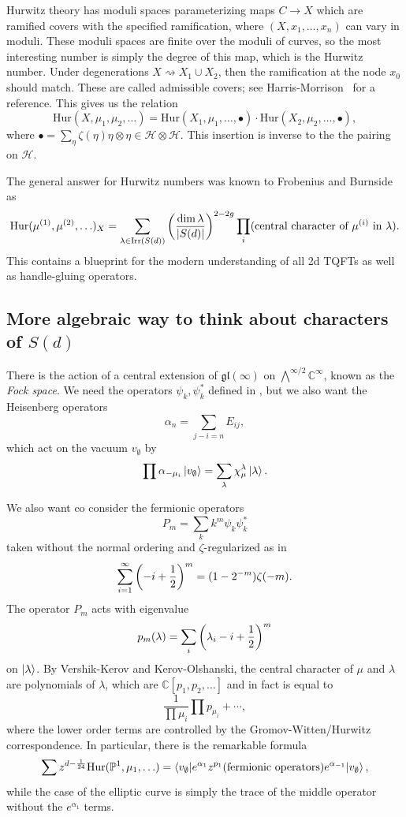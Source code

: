\documentclass[leqno, openany]{memoir}
\theoremstyle{definition}
\theoremstyle{remark}
\theoremstyle{plain}
\theoremstyle{definition}
\theoremstyle{remark}
\newcommand{\C}{\mathbb{C}}
\renewcommand{\P}{\mathbb{P}}
\newcommand{\mc}[1]{\mathcal{#1}}
\newcommand{\mf}[1]{\mathfrak{#1}}
\newcommand{\mr}[1]{\mathrm{#1}}
\begin{document}
Hurwitz theory has moduli spaces parameterizing maps $C \to X$ which are ramified covers with the specified ramification, where $(X, x_1, \ldots, x_n)$ can vary in moduli. These moduli spaces are finite over the moduli of curves, so the most interesting number is simply the degree of this map, which is the Hurwitz number. Under degenerations $X \rightsquigarrow X_1 \cup X_2$, then the ramification at the node $x_0$ should match. These are called admissible covers; see Harris-Morrison~\cite{harmor} for a reference. This gives us the relation
\[ \mr{Hur}(X, \mu_1, \mu_2, \ldots) = \mr{Hur}(X_1, \mu_1, \ldots, \bullet) \cdot \mr{Hur}(X_2, \mu_2, \ldots, \bullet), \]
where $\bullet = \sum_{\eta} \zeta(\eta) \eta \otimes \eta \in \mc{H} \otimes \mc{H}$. This insertion is inverse to the the pairing on $\mc{H}$.

The general answer for Hurwitz numbers was known to Frobenius and Burnside as
\[ \mr{Hur}(\mu^{(1)}, \mu^{(2)}, \ldots)_X = \sum_{\lambda \in \mr{Irr}(S(d))} \qty(\frac{\dim \lambda}{\abs{S(d)}})^{2-2g} \prod_i (\text{central character of }\mu^{(i)}\text{ in }\lambda). \]
This contains a blueprint for the modern understanding of all 2d TQFTs as well as handle-gluing operators.

\subsection{More algebraic way to think about characters of $S(d)$}

There is the action of a central extension of $\mf{gl}(\infty)$ on $\bigwedge^{\infty/2} \C^{\infty}$, known as the \textit{Fock space}. We need the operators $\psi_k, \psi_k^*$ defined in , but we also want the Heisenberg operators
\[ \alpha_n = \sum_{j-i=n} E_{ij}, \]
which act on the vacuum $v_{\emptyset}$ by
\[ \prod \alpha_{-\mu_i} \ket{v_{\emptyset}} = \sum_{\lambda} \chi_{\mu}^{\lambda} \ket{\lambda}. \]

We also want co consider the fermionic operators
\[ P_m = \sum_k k^m \psi_k \psi_k^* \]
taken without the normal ordering and $\zeta$-regularized as in
\[ \sum_{i=1}^{\infty} \qty(-i + \frac{1}{2})^m = (1-2^{-m})\zeta(-m). \]
The operator $P_m$ acts with eigenvalue
\[ p_m(\lambda) = \sum_i \qty(\lambda_i - i + \frac{1}{2})^m \]
on $\ket{\lambda}$. By Vershik-Kerov and Kerov-Olshanski, the central character of $\mu$ and $\lambda$ are polynomials of $\lambda$, which are $\C[p_1, p_2, \ldots]$ and in fact is equal to
\[ \frac{1}{\prod \mu_i} \prod p_{\mu_i} + \cdots, \]
where the lower order terms are controlled by the Gromov-Witten/Hurwitz correspondence. In particular, there is the remarkable formula
\[ \sum z^{d-\frac{1}{24}} \mr{Hur}(\P^1, \mu_1, \ldots) = \mel**{v_{\emptyset}}{e^{\alpha_1} z^{p_1} (\text{fermionic operators}) e^{\alpha_{-1}}}{v_{\emptyset}}, \]
while the case of the elliptic curve is simply the trace of the middle operator without the $e^{\alpha_1}$ terms.
\end{document}
